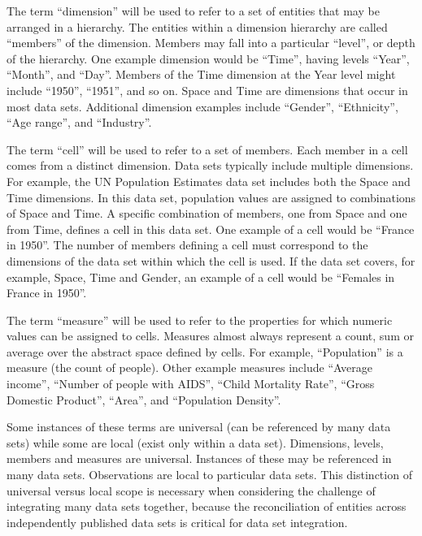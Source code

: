 \documentclass[12pt]{article}
\begin{document}
\begin{doublespace}
The term ``dimension'' will be used to refer to a set of entities that may be arranged in a hierarchy. The entities within a dimension hierarchy are called ``members'' of the dimension. Members may fall into a particular ``level'', or depth of the hierarchy. One example dimension would be ``Time'', having levels ``Year'', ``Month'', and ``Day''. Members of the Time dimension at the Year level might include ``1950'', ``1951'', and so on. Space and Time are dimensions that occur in most data sets. Additional dimension examples include ``Gender'', ``Ethnicity'', ``Age range'', and ``Industry''.

The term ``cell'' will be used to refer to a set of members. Each member in a cell comes from a distinct dimension. Data sets typically include multiple dimensions. For example, the UN Population Estimates data set includes both the Space and Time dimensions. In this data set, population values are assigned to combinations of Space and Time. A specific combination of members, one from Space and one from Time, defines a cell in this data set. One example of a cell would be ``France in 1950''. The number of members defining a cell must correspond to the dimensions of the data set within which the cell is used. If the data set covers, for example, Space, Time and Gender, an example of a cell would be ``Females in France in 1950''.

The term ``measure'' will be used to refer to the properties for which numeric values can be assigned to cells. Measures almost always represent a count, sum or average over the abstract space defined by cells. For example, ``Population'' is a measure (the count of people). Other example measures include ``Average income'', ``Number of people with AIDS'', ``Child Mortality Rate'', ``Gross Domestic Product'', ``Area'', and ``Population Density''.

Some instances of these terms are universal (can be referenced by many data sets) while some are local (exist only within a data set). Dimensions, levels, members and measures are universal. Instances of these may be referenced in many data sets. Observations are local to particular data sets. This distinction of universal versus local scope is necessary when considering the challenge of integrating many data sets together, because the reconciliation of entities across independently published data sets is critical for data set integration.


\end{doublespace}
\end{document}
